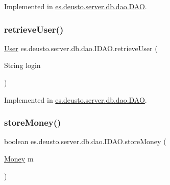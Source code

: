 Implemented in \hyperlink{classes_1_1deusto_1_1server_1_1db_1_1dao_1_1_d_a_o_a5b4aa30073fdf9ea4263a86165ed4c18}{es.\+deusto.\+server.\+db.\+dao.\+D\+AO}.

\mbox{\label{interfacees_1_1deusto_1_1server_1_1db_1_1dao_1_1_i_d_a_o_a19f9b0d0b6f5f80730d6d197deca7dfc}} 
\subsubsection{\texorpdfstring{retrieve\+User()}{retrieveUser()}}
{\footnotesize\ttfamily \hyperlink{classes_1_1deusto_1_1server_1_1db_1_1data_1_1_user}{User} es.\+deusto.\+server.\+db.\+dao.\+I\+D\+A\+O.\+retrieve\+User (\begin{DoxyParamCaption}\item[{String}]{login }\end{DoxyParamCaption})}



Implemented in \hyperlink{classes_1_1deusto_1_1server_1_1db_1_1dao_1_1_d_a_o_a8c316b4c3bf246d00fb2b423a603ebe6}{es.\+deusto.\+server.\+db.\+dao.\+D\+AO}.

\mbox{\label{interfacees_1_1deusto_1_1server_1_1db_1_1dao_1_1_i_d_a_o_a0c952a7cac366a448451d8150a8d57e4}} 
\subsubsection{\texorpdfstring{store\+Money()}{storeMoney()}}
{\footnotesize\ttfamily boolean es.\+deusto.\+server.\+db.\+dao.\+I\+D\+A\+O.\+store\+Money (\begin{DoxyParamCaption}\item[{\hyperlink{classes_1_1deusto_1_1server_1_1db_1_1data_1_1_money}{Money}}]{m }\end{DoxyParamCaption})}



